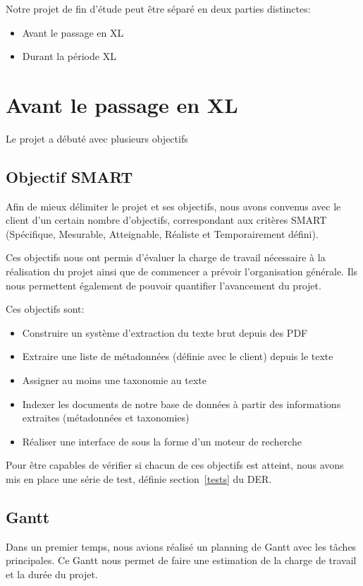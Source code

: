 
Notre projet de fin d'étude peut être séparé en deux parties distinctes:
\begin{itemize}
    \item Avant le passage en XL 
    \item Durant la période XL
\end{itemize}

\section{Avant le passage en XL}
Le projet a débuté avec plusieurs objectifs 
\subsection{Objectif SMART}
Afin de mieux délimiter le projet et ses objectifs, nous avons convenus avec le client d'un certain nombre d'objectifs, correspondant aux critères SMART (Spécifique, Mesurable, Atteignable, Réaliste et Temporairement défini).

Ces objectifs nous ont permis d'évaluer la charge de travail nécessaire à la réalisation du projet ainsi que de commencer a prévoir l'organisation générale.
Ils nous permettent également de pouvoir quantifier l'avancement du projet.

Ces objectifs sont: 
\begin{itemize}
    \item Construire un système d'extraction du texte brut depuis des PDF  
    \item Extraire une liste de métadonnées (définie avec le client) depuis le texte
    \item Assigner au moins une taxonomie au texte 
    \item Indexer les documents de notre base de données à partir des informations extraites (métadonnées et taxonomies)
    \item Réaliser une interface de sous la forme d'un moteur de recherche  
\end{itemize}

Pour être capables de vérifier si chacun de ces objectifs est atteint, nous avons mis en place une série de test, définie section~\ref{tests} du DER\@. 



\subsection{Gantt}
Dans un premier temps, nous avions réalisé un planning de Gantt avec les tâches principales.
Ce Gantt nous permet de faire une estimation de la charge de travail et la durée du projet. 

